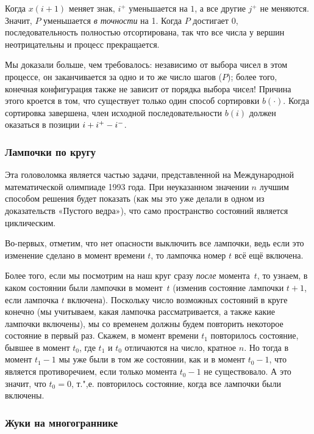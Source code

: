 \documentclass[twoside]{book}
\begin{document}
Когда $x(i+1)$ меняет знак, $i^+$ уменьшается на $1$, а все другие $j^+$ не меняются.
Значит, $P$ уменьшается \emph{в точности} на 1.
Когда $P$ достигает $0$, последовательность полностью отсортирована, так что все числа у вершин неотрицательны и процесс прекращается.

Мы доказали больше, чем требовалось:
независимо от выбора чисел в этом процессе, он заканчивается за одно и то же число шагов ($P$);
более того, конечная конфигурация также не зависит от порядка выбора чисел!
Причина этого кроется в том, что существует только один способ сортировки $b(\cdot)$.
Когда сортировка завершена, член исходной последовательности $b(i)$ должен оказаться в позиции $i \z+ i^+ - i^-$.
\heart

\subsubsection*{Лампочки по кругу}%

Эта головоломка является частью задачи, представленной на Международной математической олимпиаде 1993 года.
При неуказанном значении $n$ лучшим способом решения будет показать (как мы это уже делали в одном из доказательств «Пустого ведра»), что само пространство состояний является циклическим.

\medskip

Во-первых, отметим, что нет опасности выключить все лампочки,
ведь если это изменение сделано в момент времени $t$, то лампочка номер $t$ всё ещё включена.

Более того, если мы посмотрим на наш круг сразу \emph{после} момента~$t$, то узнаем, в каком состоянии были лампочки в момент~$t$ (изменив состояние лампочки $t+1$, если лампочка $t$ включена).
Поскольку число возможных состояний в круге конечно (мы учитываем, какая лампочка рассматривается, а также какие лампочки включены),  мы со временем должны будем повторить некоторое состояние в первый раз.
Скажем, в момент времени $t_1$ повторилось состояние, бывшее в момент $t_0$, где $t_1$ и $t_0$ отличаются на число, кратное $n$.
Но тогда в момент $t_1 - 1$ мы уже были в том же состоянии, как и в момент $t_0 - 1$, что является противоречием, если только момента $t_0 - 1$ не существовало.
А это значит, что $t_0=0$, т.",е. повторилось состояние, когда все лампочки были включены.
\heart

\subsubsection*{Жуки на многограннике}%
\end{document}
